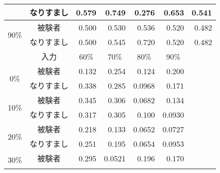 \begin{center}
\begin{longtable}[btph]{|c|c|r|r|r|r|r|}
           & なりすまし & 0.579 & 0.749 & 0.276 & 0.653 & 0.541 \\ \hline
      \multirow{2}{*}{90\%} & 被験者 & 0.500 & 0.530 & 0.536 & 0.520 & 0.482 \\ \cline{2-7}
           & なりすまし & 0.500 & 0.545 & 0.720 & 0.520 & 0.482 \\ \hline \hline
      \multicolumn{1}{|c|}{} & \multicolumn{1}{c|}{入力} & \multicolumn{1}{c|}{60\%} & \multicolumn{1}{c|}{70\%} & \multicolumn{1}{c|}{80\%} & \multicolumn{1}{c|}{90\%} & \multicolumn{1}{c|}{} \\ \hline
      \multirow{2}{*}{0\%}  & 被験者 & 0.132 & 0.254 & 0.124 & 0.200 & \\ \cline{2-7}
           & なりすまし & 0.338 & 0.285 & 0.0968 & 0.171 & \\ \hline
      \multirow{2}{*}{10\%} & 被験者 & 0.345 & 0.306 & 0.0682 & 0.134 & \\ \cline{2-7}
           & なりすまし & 0.317 & 0.305 & 0.100 & 0.0930 & \\ \hline
      \multirow{2}{*}{20\%} & 被験者 & 0.218 & 0.133 & 0.0652 & 0.0727 & \\ \cline{2-7}
           & なりすまし & 0.251 & 0.195 & 0.0654 & 0.0953 & \\ \hline
      \multirow{2}{*}{30\%} & 被験者 & 0.295 & 0.0521 & 0.196 & 0.170 & \\ \cline{2-7}

\end{longtable}
\end{center}
